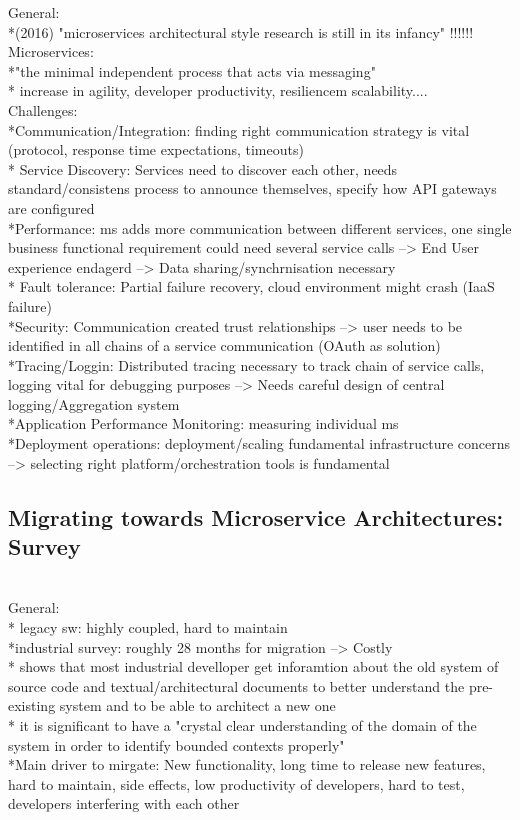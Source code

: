 General:\\
*(2016) "microservices architectural style research is still in its infancy" !!!!!!\\

Microservices:\\
*"the minimal independent process that acts via messaging"\\
* increase in agility, developer productivity, resiliencem scalability....\\


Challenges:\\
*Communication/Integration: finding right communication strategy is vital (protocol, response time expectations, timeouts)\\
* Service Discovery: Services need to discover each other, needs standard/consistens process to announce themselves, specify how API gateways are configured\\
*Performance: ms adds more communication between different services, one single business functional requirement could need several service calls --> End User experience endagerd --> Data sharing/synchrnisation necessary\\
* Fault tolerance: Partial failure recovery, cloud environment might crash (IaaS failure)\\
*Security: Communication created trust relationships --> user needs to be identified in all chains of a service communication (OAuth as solution)\\
*Tracing/Loggin: Distributed tracing necessary to track chain of service calls, logging vital for debugging purposes --> Needs careful design of central logging/Aggregation system\\
*Application Performance Monitoring: measuring individual ms\\
*Deployment operations: deployment/scaling fundamental infrastructure concerns --> selecting right platform/orchestration tools is fundamental\\


\subsection{Migrating towards Microservice Architectures: Survey}
\cite{MigratingTowardsSurvey} \\

General:\\
* legacy sw: highly coupled, hard to maintain\\
*industrial survey: roughly 28 months for migration --> Costly\\
* shows that most industrial develloper get inforamtion about the old system of source code and textual/architectural documents to better understand the pre-existing system and to be able to architect a new one\\
* it is significant to have a "crystal clear understanding of the domain of the system in order to identify bounded contexts properly"\\
*Main driver to mirgate: New functionality, long time to release new features, hard to maintain, side effects, low productivity of developers, hard to test, developers interfering with each other\\


